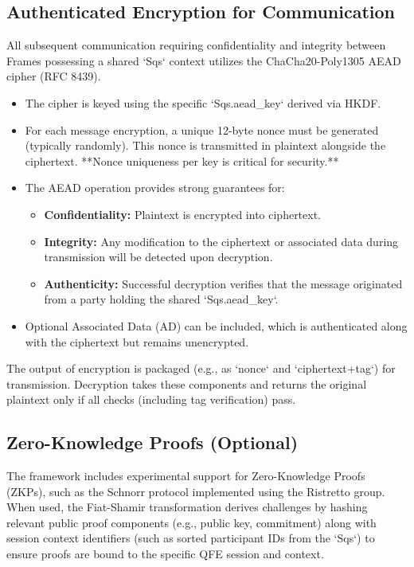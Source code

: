 \documentclass[11pt]{article}
\begin{document}
	\subsection{Authenticated Encryption for Communication}
	All subsequent communication requiring confidentiality and integrity between Frames possessing a shared `Sqs` context utilizes the ChaCha20-Poly1305 AEAD cipher (RFC 8439).
	\begin{itemize}
		\item The cipher is keyed using the specific `Sqs.aead\_key` derived via HKDF.
		\item For each message encryption, a unique 12-byte nonce must be generated (typically randomly). This nonce is transmitted in plaintext alongside the ciphertext. **Nonce uniqueness per key is critical for security.**
		\item The AEAD operation provides strong guarantees for:
		\begin{itemize}
			\item \textbf{Confidentiality:} Plaintext is encrypted into ciphertext.
			\item \textbf{Integrity:} Any modification to the ciphertext or associated data during transmission will be detected upon decryption.
			\item \textbf{Authenticity:} Successful decryption verifies that the message originated from a party holding the shared `Sqs.aead\_key`.
		\end{itemize}
		\item Optional Associated Data (AD) can be included, which is authenticated along with the ciphertext but remains unencrypted.
	\end{itemize}
	The output of encryption is packaged (e.g., as `nonce` and `ciphertext+tag`) for transmission. Decryption takes these components and returns the original plaintext only if all checks (including tag verification) pass.
	
	\subsection{Zero-Knowledge Proofs (Optional)}
	The framework includes experimental support for Zero-Knowledge Proofs (ZKPs), such as the Schnorr protocol implemented using the Ristretto group. When used, the Fiat-Shamir transformation derives challenges by hashing relevant public proof components (e.g., public key, commitment) along with session context identifiers (such as sorted participant IDs from the `Sqs`) to ensure proofs are bound to the specific QFE session and context.
	
\end{document}

